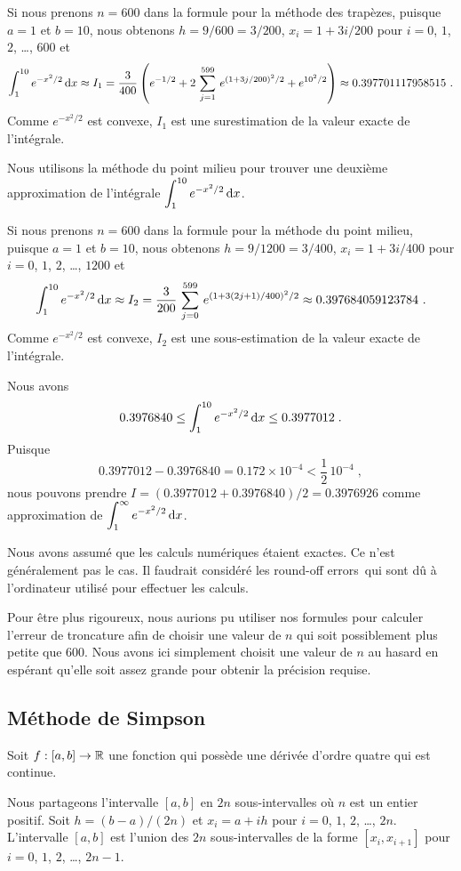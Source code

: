 {\begin{egg}
Si nous prenons $n = 600$ dans la formule pour la méthode des trapèzes,
puisque $a=1$ et $b=10$, nous obtenons $h = 9/600 = 3/200$,
$x_i = 1+ 3i/200$ pour $i=0$, $1$, $2$, \ldots, $600$ et
\[
\int_1^{10} e^{-x^2/2} \,\mathrm{d}x \approx I_1 = 
\frac{3}{400} \left( e^{-1/2} + 2 \, \sum_{j=1}^{599}\,e^{(1+3j/200)^2/2} +
e^{10^2/2} \right) \approx 0.397701117958515 \ .
\]
Comme $e^{-x^2/2}$ est convexe, $I_1$ est une surestimation de
la valeur exacte de l'intégrale.

Nous utilisons la méthode du point milieu pour trouver une deuxième
approximation de l'intégrale
$\displaystyle \int_1^{10} e^{-x^2/2} \,\mathrm{d}x$.

Si nous prenons $n = 600$ dans la formule pour la méthode du point milieu,
puisque $a=1$ et $b=10$, nous obtenons $h = 9/1200 = 3/400$,
$x_i = 1+ 3i/400$ pour $i=0$, $1$, $2$, \ldots, $1200$ et
\[
\int_1^{10} e^{-x^2/2} \,\mathrm{d}x \approx I_2 = 
\frac{3}{200}\, \sum_{j=0}^{599}\,e^{(1+3(2j+1)/400)^2/2}
\approx 0.397684059123784 \ .
\]
Comme $e^{-x^2/2}$ est convexe, $I_2$ est une sous-estimation de
la valeur exacte de l'intégrale.

Nous avons
\[
0.3976840 \leq \int_1^{10} e^{-x^2/2} \,\mathrm{d}x \leq 0.3977012 \; .
\]
Puisque
\[
0.3977012 - 0.3976840 = 0.172 \times 10^{-4} < \frac{1}{2} \, 10^{-4} \; ,
\]
nous pouvons prendre $I= (0.3977012 + 0.3976840)/2 = 0.3976926$ comme
approximation de $\displaystyle \int_1^\infty e^{-x^2/2} \,\mathrm{d}x$.

Nous avons assumé que les calculs numériques étaient exactes.
Ce n'est généralement pas le cas.  Il faudrait considéré les
\lgm round-off errors\rgm\ qui sont dû à l'ordinateur utilisé pour
effectuer les calculs.

Pour être plus rigoureux, nous aurions pu utiliser nos formules pour
calculer l'erreur de troncature afin de choisir une valeur de $n$ qui
soit possiblement plus petite que $600$.  Nous avons ici simplement choisit
une valeur de $n$ au hasard en espérant qu'elle soit assez grande pour
obtenir la précision requise.
\end{egg}

\subsection{Méthode de Simpson}

Soit $f:[a,b]\rightarrow \mathbb{R}$ une fonction qui possède une dérivée
d'ordre quatre qui est continue.

Nous partageons l'intervalle $[a,b]$ en $2n$ sous-intervalles
où $n$ est un entier positif.  Soit $h = (b-a)/(2n)$ et $x_i = a + i h$
pour $i=0$, $1$, $2$, \ldots, $2n$.  L'intervalle $[a,b]$ est l'union
des $2n$ sous-intervalles de la forme $[x_i,x_{i+1}]$ pour $i=0$, $1$,
$2$, \ldots, $2n-1$.

}
